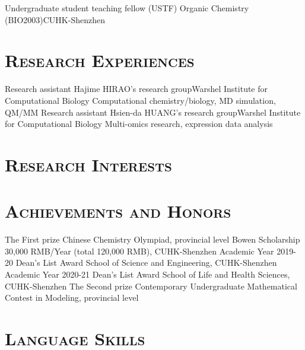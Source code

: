 \documentclass[11pt,a4paper]{moderncv}
\newcommand{\cvsection}[1]{\section{\textsc{#1}}}
\begin{document}
        {Undergraduate student teaching fellow (USTF)}{}
        {Organic Chemistry (BIO2003)}{CUHK-Shenzhen}
        {
        }


\cvsection{Research Experiences}
        {Research assistant}{}
        {Hajime HIRAO's research group}{Warshel Institute
        for Computational Biology}
        {Computational chemistry/biology, MD simulation, QM/MM}
        {Research assistant}{}
        {Hsien-da HUANG's research group}{Warshel Institute
        for Computational Biology}
        {Multi-omics research, expression data analysis}


\cvsection{Research Interests}

\cvsection{Achievements and Honors}
        {The First prize}{}
        {Chinese Chemistry Olympiad, provincial level}{}
        {}
        {Bowen Scholarship}{}
        {30,000 RMB/Year (total 120,000 RMB), CUHK-Shenzhen}{}
        {}
        {Academic Year 2019-20 Dean's List Award}{}
        {School of Science and Engineering, CUHK-Shenzhen}{}
        {}
        {Academic Year 2020-21 Dean's List Award}{}
        {School of Life and Health Sciences, CUHK-Shenzhen}{}
        {}
        {The Second prize}{}
        {Contemporary Undergraduate Mathematical Contest in Modeling, provincial level}{}
        {}

\cvsection{Language Skills}

\end{document}
